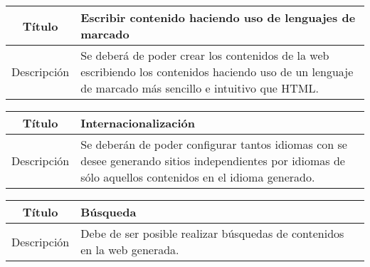 \begin{center}

    \begin{tabularx}{\textwidth}{|c|X|}
        \hline
        Título & Escribir contenido haciendo uso de lenguajes de marcado\\

        \hline

        Descripción & Se deberá de poder crear los contenidos de la web escribiendo
        los contenidos haciendo uso de un lenguaje de marcado más sencillo e
        intuitivo que HTML.\\

        \hline
    \end{tabularx}
\end{center}

\begin{center}

    \begin{tabularx}{\textwidth}{|c|X|}
        \hline
        Título & Internacionalización\\

        \hline

        Descripción & Se deberán de poder configurar tantos idiomas con se desee
        generando sitios independientes por idiomas de sólo aquellos contenidos
        en el idioma generado.\\

        \hline
    \end{tabularx}
\end{center}

\begin{center}

    \begin{tabularx}{\textwidth}{|c|X|}
        \hline
        Título & Búsqueda\\

        \hline

        Descripción & Debe de ser posible realizar búsquedas de contenidos en la web generada.\\

        \hline
    \end{tabularx}
\end{center}

